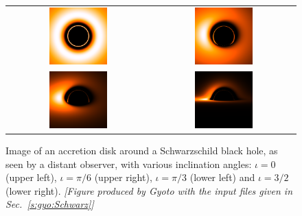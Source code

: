 \begin{figure}
\begin{center}
\begin{tabular}{cc}
\includegraphics[width=0.42\textwidth]{gis_disk_0.png} &
\includegraphics[width=0.42\textwidth]{gis_disk_pi6.png} \\[1ex]
\includegraphics[width=0.42\textwidth]{gis_disk_pi3.png} &
\includegraphics[width=0.42\textwidth]{gis_disk_1_5.png}
\end{tabular}
\end{center}
\caption[]{\label{f:gis:disk_images} \footnotesize
Image of an accretion disk around a Schwarzschild black hole, as seen
by a distant observer, with various inclination angles:
$\iota=0$ (upper left), $\iota=\pi/6$ (upper right), $\iota=\pi/3$ (lower left)
and $\iota=3/2$ (lower right).
\textsl{[Figure produced by \textsf{Gyoto} with the input
files given in Sec.~\ref{s:gyo:Schwarz}]}
}
\end{figure}

